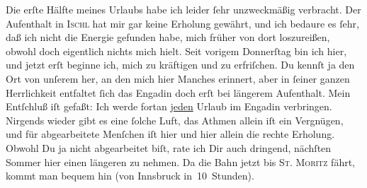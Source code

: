 \pstart
           Die erſte Hälfte meines Urlaubs habe ich leider{ }ſehr unzweckmäßig verbracht. Der
               Aufenthalt in \textsc{Ischl} hat mir gar keine Erholung gewährt, und ich bedaure {\pb}es{ }ſehr, daß ich nicht die Energie gefunden habe, mich
               früher von dort loszureißen, obwohl doch eigentlich nichts mich hielt. Seit vorigem
                  Donnerſtag bin ich hier, und jetzt erſt beginne
               ich, mich zu kräftigen und zu erfriſchen. Du kennſt ja den Ort von unſerem \label{K_L03080-2v}\label{K_L03080-2} her, an den \strikeout{\textcolor{gray}{ich}} mich  hier Manches erinnert, aber in{ }ſeiner ganzen Herrlichkeit entfaltet{ }ſich das
                  Engadin doch erſt bei längerem Aufenthalt.
               Mein Entſchluß iſt gefaßt: Ich werde fortan \uline{jeden}
               Urlaub im Engadin verbringen. Nirgends wieder
               gibt es eine {\pb}ſolche Luft, das Athmen allein iſt ein
               Vergnügen, und für abgearbeitete Menſchen iſt hier und hier allein die rechte
               Erholung. Obwohl Du ja nicht abgearbeitet biſt, rate ich Dir auch dringend, nächſten
               Sommer hier einen längeren \label{K_L03080-3v}\label{K_L03080-3} zu nehmen. Da die
               Bahn jetzt bis \textsc{St. Moritz} fährt, kommt man bequem hin (von Innsbruck
               in 10 Stunden).\pend
           

